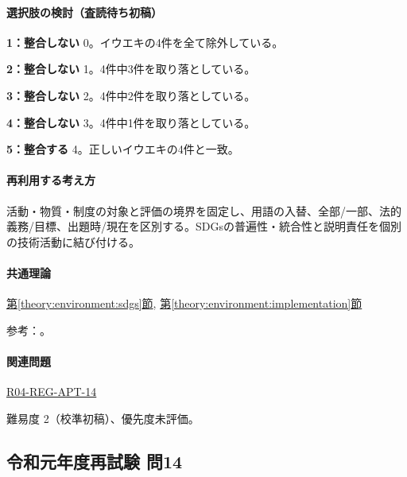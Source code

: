 \paragraph{選択肢の検討（査読待ち初稿）}\mbox{}\par

\noindent\textbf{1：整合しない} 0。イウエキの4件を全て除外している。\par

\noindent\textbf{2：整合しない} 1。4件中3件を取り落としている。\par

\noindent\textbf{3：整合しない} 2。4件中2件を取り落としている。\par

\noindent\textbf{4：整合しない} 3。4件中1件を取り落としている。\par

\noindent\textbf{5：整合する} 4。正しいイウエキの4件と一致。\par

\paragraph{再利用する考え方} 活動・物質・制度の対象と評価の境界を固定し、用語の入替、全部/一部、法的義務/目標、出題時/現在を区別する。SDGsの普遍性・統合性と説明責任を個別の技術活動に結び付ける。

\paragraph{共通理論} \hyperref[theory:environment:sdgs]{第\ref*{theory:environment:sdgs}節}, \hyperref[theory:environment:implementation]{第\ref*{theory:environment:implementation}節}

\par 参考：\cite{env_sdgs_agenda,env_sdgs2016,env_sdgs_un}。

\paragraph{関連問題} \hyperref[q:r04-reg-apt-14]{R04-REG-APT-14}

\par 難易度 2（校準初稿）、優先度未評価。

\subsection{令和元年度再試験 問14}
\label{q:r01-ret-apt-14}

